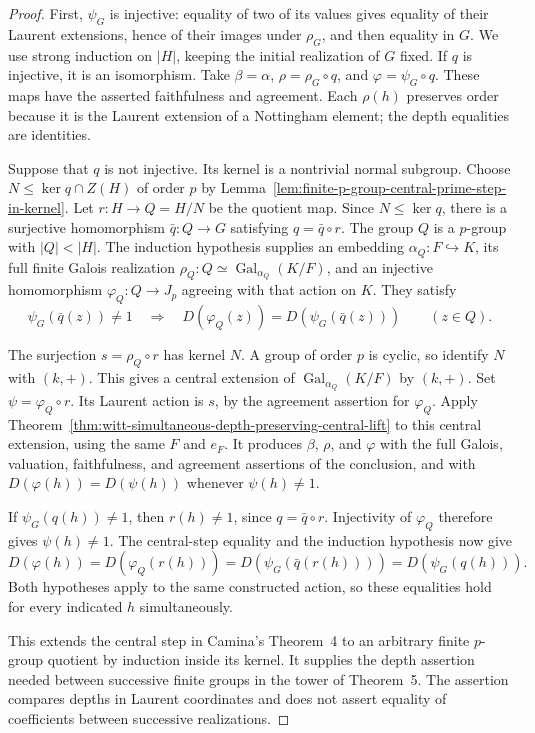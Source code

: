 \begin{proof}
First, $\psi_G$ is injective: equality of two of its values gives
equality of their Laurent extensions, hence of their images under
$\rho_G$, and then equality in $G$.
We use strong induction on $|H|$, keeping the initial realization
of $G$ fixed. If $q$ is injective, it is an isomorphism.
Take $\beta=\alpha$, $\rho=\rho_G\circ q$, and
$\varphi=\psi_G\circ q$. These maps have the asserted
faithfulness and agreement. Each $\rho(h)$ preserves order because
it is the Laurent extension of a Nottingham element; the depth
equalities are identities.

Suppose that $q$ is not injective. Its kernel is a nontrivial
normal subgroup. Choose $N\le\ker q\cap Z(H)$ of order $p$
by Lemma~\ref{lem:finite-p-group-central-prime-step-in-kernel}.
Let $r:H\to Q=H/N$ be the quotient map. Since $N\le\ker q$,
there is a surjective homomorphism $\bar q:Q\to G$ satisfying
$q=\bar q\circ r$. The group $Q$ is a $p$-group with $|Q|<|H|$.
The induction hypothesis supplies an embedding
$\alpha_Q:F\hookrightarrow K$, its full finite Galois
realization $\rho_Q:Q\simeq\operatorname{Gal}_{\alpha_Q}(K/F)$,
and an injective homomorphism $\varphi_Q:Q\to J_p$ agreeing
with that action on $K$. They satisfy
\[
 \psi_G(\bar q(z))\ne1\quad\Longrightarrow\quad
 D(\varphi_Q(z))=D(\psi_G(\bar q(z)))
 \qquad(z\in Q).
\]

The surjection $s=\rho_Q\circ r$ has kernel $N$.
A group of order $p$ is cyclic, so identify $N$ with $(k,+)$.
This gives a central extension of
$\operatorname{Gal}_{\alpha_Q}(K/F)$ by $(k,+)$.
Set $\psi=\varphi_Q\circ r$. Its Laurent action is $s$,
by the agreement assertion for $\varphi_Q$.
Apply Theorem~\ref{thm:witt-simultaneous-depth-preserving-central-lift}
to this central extension, using the same $F$ and $e_F$.
It produces $\beta$, $\rho$, and $\varphi$ with the full
Galois, valuation, faithfulness, and agreement assertions of
the conclusion, and with $D(\varphi(h))=D(\psi(h))$
whenever $\psi(h)\ne1$.

If $\psi_G(q(h))\ne1$, then $r(h)\ne1$, since
$q=\bar q\circ r$. Injectivity of $\varphi_Q$ therefore
gives $\psi(h)\ne1$. The central-step equality and the induction
hypothesis now give
\[
 D(\varphi(h))=D(\varphi_Q(r(h)))
             =D(\psi_G(\bar q(r(h))))
             =D(\psi_G(q(h))).
\]
Both hypotheses apply to the same constructed action, so these
equalities hold for every indicated $h$ simultaneously.

This extends the central step in Camina's Theorem~4 to an arbitrary
finite $p$-group quotient by induction inside its kernel. It supplies
the depth assertion needed between successive finite groups in
the tower of Theorem~5. The assertion compares depths in Laurent
coordinates and does not assert equality of coefficients between
successive realizations.
\end{proof}
